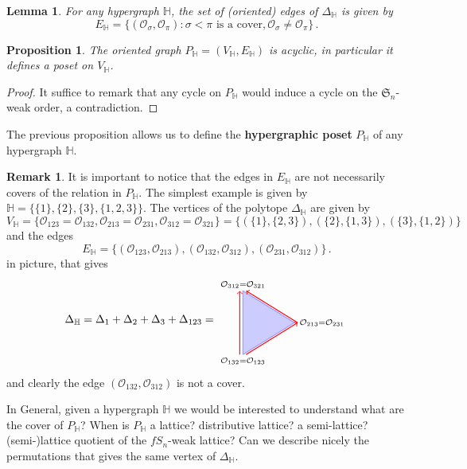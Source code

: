 \documentclass[reqno]{amsart}
\newtheorem{proposition}[theorem]{Proposition}
\newtheorem{lemma}[theorem]{Lemma}
\theoremstyle{definition}
\newtheorem{remark}[theorem]{Remark}
\newcommand{\defn}[1]{\textbf{\textsf{\color{PineGreen} #1}}} %
\newcommand{\fS}{\mathfrak{S}} %
\newcommand{\Or}{\mathcal O}  %
\newcommand{\HH}{\mathbb H}  %
\begin{document}
\begin{lemma}\label{lem:Hedges}
For any hypergraph $\HH$, the set of (oriented) edges of $\Delta_{\HH}$ is given by 
 $$E_{\HH}=\{(\Or_\sigma,\Or_\pi): \sigma<\pi \text{ is a cover}, \Or_\sigma\ne\Or_\pi\}\,.$$
\end{lemma}

\begin{proposition}\label{prop:PHisOrder}
The oriented graph $P_{\HH}=(V_{\HH},E_{\HH})$ is acyclic, in particular it defines a poset on $V_{\HH}$.
\end{proposition}

\begin{proof} It suffice to remark that any cycle on $P_{\HH}$ would induce a cycle on the $\fS_n$-weak order, a contradiction.
\end{proof}

The previous proposition allows us to define the \defn{hypergraphic poset} $P_{\HH}$ of any hypergraph $\HH$. 

\begin{remark}\label{rem:EdgeNotCover}
It is important to notice that the edges in $E_{\HH}$ are not necessarily covers of the relation in $P_{\HH}$. The simplest example is given by $\HH=\big\{\{1\},\{2\},\{3\},\{1,2,3\}\big\}$.
The vertices of the polytope $\Delta_{\HH}$ are given by
	$$ V_{\HH}=\big\{ \Or_{123}=\Or_{132}, \Or_{213}=\Or_{231}, \Or_{312}=\Or_{321}\big\}= \big\{ (\{1\},\{2,3\}),(\{2\},\{1,3\}),(\{3\},\{1,2\})\big\}$$
and the edges
	$$ E_{\HH}=\big\{ (\Or_{123},\Or_{213}),(\Or_{132},\Or_{312}),(\Or_{231}, \Or_{312})\big\}\,.$$
in picture, that gives
$$\Delta_\HH=\Delta_1+\Delta_2+\Delta_3+\Delta_{123}=
\begin{tikzpicture}[scale=1,baseline=.0cm]
	\node (a) at (0,-1.2) {$\scriptstyle \Or_{132}=\Or_{123}$};
	\node (b) at (2.5,0) {$\scriptstyle \Or_{213}=\Or_{231}$};
	\node (c) at (0,1.2) {$\scriptstyle \Or_{312}=\Or_{321}$};
	\draw [color=blue!40,thick,fill=blue!20] (0,-1)--(0,1)--(1.632,0)--(0,-1) ; 
	\draw [color=red,thick,->] (-.1,-1)--(-.1,1); 
	\draw [color=red,thick,->] (1.732,0)--(.1,1); 
	\draw [color=red,thick,->] (.1,-1)--(1.732,0); 
\end{tikzpicture}
$$
and clearly the edge $(\Or_{132},\Or_{312})$ is not a cover. 
\end{remark}

In General, given a hypergraph $\HH$ we would be interested to understand what are the cover of $P_{\HH}$? 
When is $P_{\HH}$ a lattice? distributive lattice? a semi-lattice? (semi-)lattice quotient of the $fS_n$-weak lattice?
Can we describe nicely the permutations that gives the same vertex of $\Delta_{\HH}$. 
\end{document}
